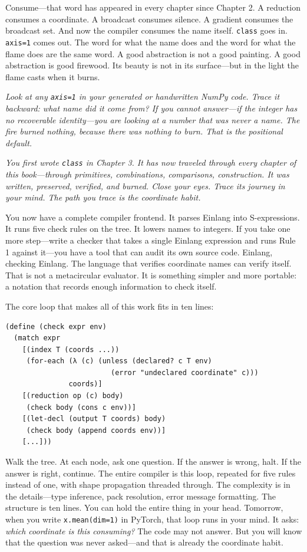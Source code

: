 \documentclass[11pt,titlepage]{article}
\begin{document}
Consume---that word has appeared in every chapter since Chapter 2. A
reduction consumes a coordinate. A broadcast consumes silence. A
gradient consumes the broadcast set. And now the compiler consumes the
name itself. \texttt{class} goes in. \texttt{axis=1} comes out. The word
for what the name does and the word for what the flame does are the same
word. A good abstraction is not a good painting. A good abstraction is
good firewood. Its beauty is not in its surface---but in the light the
flame casts when it burns.

\emph{Look at any \texttt{axis=1} in your generated or handwritten NumPy
code. Trace it backward: what name did it come from? If you cannot
answer---if the integer has no recoverable identity---you are looking at
a number that was never a name. The fire burned nothing, because there
was nothing to burn. That is the positional default.}

\emph{You first wrote \texttt{class} in Chapter 3. It has now traveled
through every chapter of this book---through primitives, combinations,
comparisons, construction. It was written, preserved, verified, and
burned. Close your eyes. Trace its journey in your mind. The path you
trace is the coordinate habit.}

\vspace{2em}

You now have a complete compiler frontend. It parses Einlang into
S-expressions. It runs five check rules on the tree. It lowers names to
integers. If you take one more step---write a checker that takes a
single Einlang expression and runs Rule 1 against it---you have a tool
that can audit its own source code. Einlang, checking Einlang. The
language that verifies coordinate names can verify itself. That is not a
metacircular evaluator. It is something simpler and more portable: a
notation that records enough information to check itself.

The core loop that makes all of this work fits in ten lines:

\begin{verbatim}
(define (check expr env)
  (match expr
    [(index T (coords ...))
     (for-each (λ (c) (unless (declared? c T env)
                         (error "undeclared coordinate" c)))
               coords)]
    [(reduction op (c) body)
     (check body (cons c env))]
    [(let-decl (output T coords) body)
     (check body (append coords env))]
    [...]))
\end{verbatim}

Walk the tree. At each node, ask one question. If the answer is wrong,
halt. If the answer is right, continue. The entire compiler is this
loop, repeated for five rules instead of one, with shape propagation
threaded through. The complexity is in the details---type inference,
pack resolution, error message formatting. The structure is ten lines.
You can hold the entire thing in your head. Tomorrow, when you write
\texttt{x.mean(dim=1)} in PyTorch, that loop runs in your mind. It asks:
\emph{which coordinate is this consuming?} The code may not answer. But
you will know that the question was never asked---and that is already
the coordinate habit.
\end{document}
